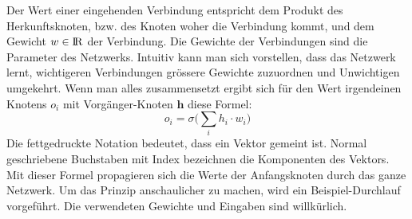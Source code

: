 Der Wert einer eingehenden Verbindung entspricht dem Produkt des Herkunftsknoten, bzw. des Knoten woher die Verbindung kommt, und dem Gewicht $w \in \rm I\!R$ der Verbindung. Die Gewichte der Verbindungen sind die Parameter des Netzwerks. Intuitiv kann man sich vorstellen, dass das Netzwerk lernt, wichtigeren Verbindungen grössere Gewichte zuzuordnen und Unwichtigen umgekehrt. Wenn man alles zusammensetzt ergibt sich für den Wert irgendeinen Knotens $o_i$ mit Vorgänger-Knoten $\boldsymbol{h}$ diese Formel:
$$ o_i = \sigma\Big(\sum_i h_i \cdot w_{i}\Big)$$
Die fettgedruckte Notation bedeutet, dass ein Vektor gemeint ist. Normal geschriebene Buchstaben mit Index bezeichnen die Komponenten des Vektors. Mit dieser Formel propagieren sich die Werte der Anfangsknoten durch das ganze Netzwerk. Um das Prinzip anschaulicher zu machen, wird ein Beispiel-Durchlauf vorgeführt. Die verwendeten Gewichte und Eingaben sind willkürlich.

